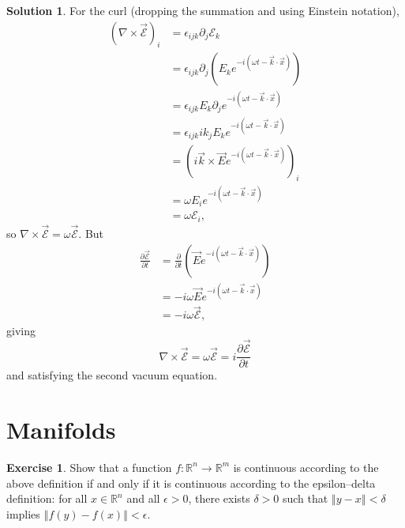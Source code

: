 \documentclass[11pt, a4paper]{article}
\newcommand*{\norm}[1]{\ensuremath{\left\Vert#1\right\Vert}}
\theoremstyle{definition}
\newtheorem{ex}{Exercise}[part]
\newtheorem{sol}{Solution}[part]
\begin{document}
\begin{sol}
For the curl (dropping the summation and using Einstein notation),
\begin{align*}
    {\left( \nabla \times \vec{\mathcal{E}} \right)}_i &= \epsilon_{ijk} \partial_j \mathcal{E}_k \\
        &= \epsilon_{ijk} \partial_j \left(E_k e^{-i(\omega t - \vec{k} \cdot \vec{x})} \right) \\
        &= \epsilon_{ijk} E_k \partial_j e^{-i(\omega t - \vec{k} \cdot \vec{x})} \\
        &= \epsilon_{ijk}i k_j E_k e^{-i(\omega t - \vec{k} \cdot \vec{x})} \\
        &= {\left(i \vec{k} \times \vec{E} e^{-i(\omega t - \vec{k} \cdot \vec{x})} \right)}_i \\
        &= \omega E_i e^{-i(\omega t - \vec{k} \cdot \vec{x})} \\
        &= \omega \mathcal{E}_i,
\end{align*}
so $\nabla \times \vec{\mathcal{E}} = \omega \vec{\mathcal{E}}$.
But
\begin{align*}
    \frac{\partial \vec{\mathcal{E}}}{\partial t} &= \frac{\partial}{\partial t} \left(\vec{E} e^{-i(\omega t - \vec{k} \cdot \vec{x})} \right) \\
        &= -i \omega \vec{E} e^{-i(\omega t - \vec{k} \cdot \vec{x})} \\
        &= -i \omega \vec{\mathcal{E}},
\end{align*}
giving
\[
    \nabla \times \vec{\mathcal{E}} = \omega \vec{\mathcal{E}} = i \frac{\partial \vec{\mathcal{E}}}{\partial t}
\]
and satisfying the second vacuum equation.

\end{sol}

\section{Manifolds}

\begin{ex}

Show that a function $f: \mathbb{R}^n \to \mathbb{R}^m$ is continuous according to the above definition if and only if it is continuous according to the epsilon--delta definition: for all $x \in \mathbb{R}^n$ and all $\epsilon > 0$, there exists $\delta > 0$ such that $\norm{y - x} < \delta$ implies $\norm{f(y) - f(x)} < \epsilon$.

\end{ex}
\end{document}
